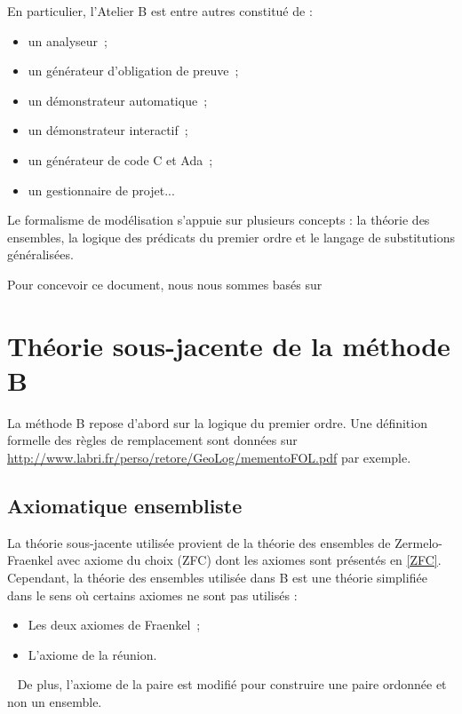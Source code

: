 \documentclass[10pt,a4paper]{article}
\begin{document}
En particulier, l'Atelier B est entre autres constitué de :
\begin{itemize}
\item un analyseur~;
\item un générateur d'obligation de preuve~;
\item un démonstrateur automatique~;
\item un démonstrateur interactif~;
\item un générateur de code C et Ada~;
\item un gestionnaire de projet...
\end{itemize}

Le formalisme de modélisation s'appuie sur plusieurs concepts : la théorie des ensembles, la logique des prédicats du premier ordre et le langage de substitutions généralisées.

Pour concevoir ce document, nous nous sommes basés sur \cite{behm1999meteor, habrias2006specifications, theBBook, dossierTechnique, VerimagPDF}

\section{Théorie sous-jacente de la méthode B}

La méthode B repose d'abord sur la logique du premier ordre. Une définition formelle des règles de remplacement sont données sur \url{http://www.labri.fr/perso/retore/GeoLog/mementoFOL.pdf} par exemple.

\subsection{Axiomatique ensembliste}

La théorie sous-jacente utilisée provient de la théorie des ensembles de Zermelo-Fraenkel avec axiome du choix (ZFC) dont les axiomes sont présentés en \cref{ZFC}.
Cependant, la théorie des ensembles utilisée dans B est une théorie simplifiée dans le sens où certains axiomes ne sont pas utilisés :
\begin{itemize}
\item Les deux axiomes de  Fraenkel~;
\item L'axiome de la réunion.
\end{itemize}~
De plus, l'axiome de la paire est modifié pour construire une paire ordonnée et non un ensemble. 
\end{document}
